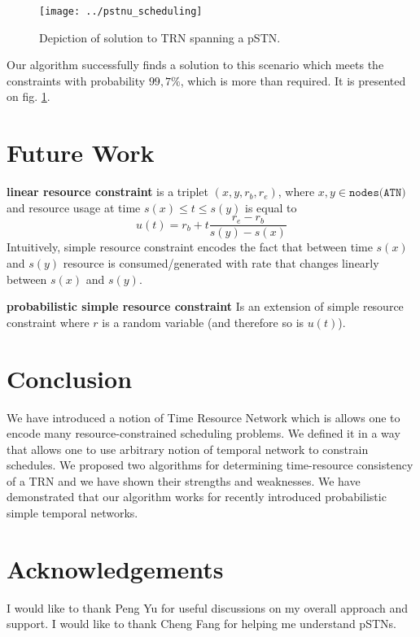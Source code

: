 \documentclass{article}
\begin{document}
\begin{multicols}{2}
\begin{figure}[H]
\begin{center}
\texttt{[image: ../pstnu\_scheduling]}
\caption{Depiction of solution to TRN spanning a pSTN.}
\label{fig:pstnu_scheduling}
\end{center}
\end{figure}

Our algorithm successfully finds a solution to this scenario which meets the constraints with probability $99,7\%$, which is more than required. It is presented on fig. \ref{fig:pstnu_scheduling}.



\section{Future Work}
\textbf{linear resource constraint} is a triplet $(x, y, r_b, r_e)$, where $x, y \in \texttt{nodes(ATN)}$ and resource usage at time $s(x) \leq t \leq s(y)$ is equal to
\[
    u(t) = r_b + t  \frac{r_e - r_b}{s(y) - s(x)}
\]
Intuitively, simple resource constraint encodes the fact that between time $s(x)$ and $s(y)$  resource is consumed/generated with rate that changes linearly between $s(x)$ and $s(y)$.

\textbf{probabilistic simple resource constraint}
Is an extension of simple resource constraint where $r$ is a random variable (and therefore so is $u(t)$).




\section{Conclusion}
We have introduced a notion of Time Resource Network which is allows one to encode many resource-constrained scheduling problems. We defined it in a way that allows one to use arbitrary notion of temporal network to constrain schedules. We proposed two algorithms for determining time-resource consistency of a TRN and we have shown their strengths and weaknesses. We have demonstrated that our algorithm works for recently introduced probabilistic simple temporal networks.
\section{Acknowledgements}
I would like to thank Peng Yu for useful discussions on my overall approach and support. I would like to thank Cheng Fang for helping me understand pSTNs.


\end{multicols}
\end{document}
